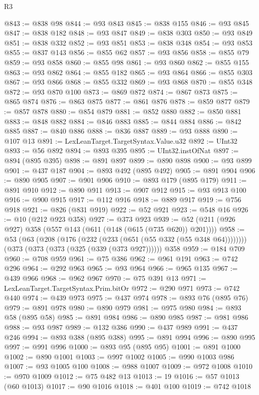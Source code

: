 \begin{lexlean}{R3}
\begin{coremodule}
@843 := @838 @98
@844 := @93 @843
@845 := @838 @155
@846 := @93 @845
@847 := @838 @182
@848 := @93 @847
@849 := @838 @303
@850 := @93 @849
@851 := @838 @332
@852 := @93 @851
@853 := @838 @348
@854 := @93 @853
@855 := @837 @143
@856 := @855 @62
@857 := @93 @856
@858 := @855 @79
@859 := @93 @858
@860 := @855 @98
@861 := @93 @860
@862 := @855 @155
@863 := @93 @862
@864 := @855 @182
@865 := @93 @864
@866 := @855 @303
@867 := @93 @866
@868 := @855 @332
@869 := @93 @868
@870 := @855 @348
@872 := @93 @870 @100
@873 := @869 @872
@874 := @867 @873
@875 := @865 @874
@876 := @863 @875
@877 := @861 @876
@878 := @859 @877
@879 := @857 @878
@880 := @854 @879
@881 := @852 @880
@882 := @850 @881
@883 := @848 @882
@884 := @846 @883
@885 := @844 @884
@886 := @842 @885
@887 := @840 @886
@888 := @836 @887
@889 := @93 @888
@890 := @107 @13
@891 := LexLeanTarget.TargetSyntax.Value.u32
@892 := UInt32
@893 := @56 @892
@894 := @893 @395
@895 := UInt32.instOfNat
@897 := @894 (@895 @395)
@898 := @891 @897
@899 := @890 @898
@900 := @93 @899
@901 := @437 @187
@904 := @893 @492 (@895 @492)
@905 := @891 @904
@906 := @890 @905
@907 := @901 @906
@910 := @893 @179 (@895 @179)
@911 := @891 @910
@912 := @890 @911
@913 := @907 @912
@915 := @93 @913 @100
@916 := @900 @915
@917 := @112 @916
@918 := @889 @917
@919 := @756 @918
@921 := @826 (@831 @919)
@922 := @52 @921
@923 := @548 @16
@926 := @10 (@212 @923 @358)
@927 := @373 @923
@939 := @52 (@211 (@926 @927) @358 (@557 @143 (@611 (@148 (@615 (@735 @620)) @201))))
@958 := @53
    (@63 (@208 (@176 (@232 (@233 (@651 (@55 @332 (@55 @348 @64))))))))
    (@373 (@373 (@373 (@325 (@339 (@373 @927))))))
    @358
@959 := @184 @709
@960 := @708 @959
@961 := @75 @386
@962 := @961 @191
@963 := @742 @296
@964 := @292 @963
@965 := @93 @964
@966 := @965 @135
@967 := @439 @966
@968 := @962 @967
@970 := @75 @391 @13
@971 := LexLeanTarget.TargetSyntax.Prim.bitOr
@972 := @290 @971
@973 := @742 @440
@974 := @439 @973
@975 := @437 @974
@978 := @893 @76 (@895 @76)
@979 := @891 @978
@980 := @890 @979
@981 := @975 @980
@984 := @893 @58 (@895 @58)
@985 := @891 @984
@986 := @890 @985
@987 := @981 @986
@988 := @93 @987
@989 := @132 @386
@990 := @437 @989
@991 := @437 @246
@994 := @893 @388 (@895 @388)
@995 := @891 @994
@996 := @890 @995
@997 := @991 @996
@1000 := @893 @95 (@895 @95)
@1001 := @891 @1000
@1002 := @890 @1001
@1003 := @997 @1002
@1005 := @990 @1003 @986
@1007 := @93 @1005 @100
@1008 := @988 @1007
@1009 := @972 @1008
@1010 := @970 @1009
@1012 := @75 @482 @13
@1013 := 19
@1016 := @57 @1013 (@60 @1013)
@1017 := @90 @1016
@1018 := @401 @100
@1019 := @742 @1018

\end{coremodule}
\end{lexlean}
